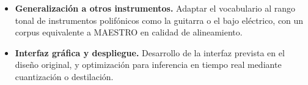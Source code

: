 \begin{itemize}
    \item \textbf{Generalización a otros instrumentos.} Adaptar el
    vocabulario al rango tonal de instrumentos polifónicos como la
    guitarra o el bajo eléctrico, con un corpus equivalente a MAESTRO
    en calidad de alineamiento.

    \item \textbf{Interfaz gráfica y despliegue.} Desarrollo de la
    interfaz prevista en el diseño original, y optimización para
    inferencia en tiempo real mediante cuantización o destilación.
\end{itemize}